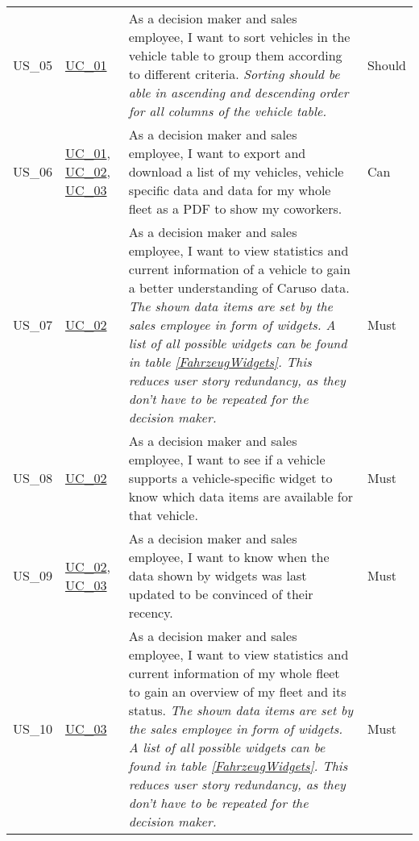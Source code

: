 \begin{footnotesize}
\begin{longtable}[L L L L]{ p{} p{} p{} p{}}
      \hypertarget{Ref:US5}{US\_05} & \hyperlink{Ref:UC1}{UC\_01} & As a decision maker and sales employee, I want to sort vehicles in the vehicle table to group them according to different criteria. 
      \newline\newline
      \emph{Sorting should be able in ascending and descending order for all columns of the vehicle table.} & Should
      \\

      \hypertarget{Ref:US6}{US\_06} & \hyperlink{Ref:UC1}{UC\_01}, \newline \hyperlink{Ref:UC2}{UC\_02}, \newline \hyperlink{Ref:UC3}{UC\_03} & As a decision maker and sales employee, I want to export and download a list of my vehicles, vehicle specific data and data for my whole fleet as a PDF to show my coworkers. & Can \\

      \hypertarget{Ref:US7}{US\_07} & \hyperlink{Ref:UC2}{UC\_02} & As a decision maker and sales employee, I want to view statistics and current information of a vehicle to gain a better understanding of Caruso data. 
      \newline\newline
      \emph{The shown data items are set by the sales employee in form of widgets. A list of all possible widgets can be found in table \ref{FahrzeugWidgets}. This reduces user story redundancy, as they don't have to be repeated for the decision maker.} & Must \\

      \hypertarget{Ref:US8}{US\_08} & \hyperlink{Ref:UC2}{UC\_02} & As a decision maker and sales employee, I want to see if a vehicle supports a vehicle-specific widget to know which data items are available for that vehicle. & Must
      \\

      \hypertarget{Ref:US9}{US\_09} & \hyperlink{Ref:UC2}{UC\_02}, \newline \hyperlink{Ref:UC3}{UC\_03} & As a decision maker and sales employee, I want to know when the data shown by widgets was last updated to be convinced of their recency. & Must
      \\

      \hypertarget{Ref:US10}{US\_10} & \hyperlink{Ref:UC3}{UC\_03} & As a decision maker and sales employee, I want to view statistics and current information of my whole fleet to gain an overview of my fleet and its status.
      \newline\newline
      \emph{The shown data items are set by the sales employee in form of widgets. A list of all possible widgets can be found in table \ref{FahrzeugWidgets}. This reduces user story redundancy, as they don't have to be repeated for the decision maker.} & Must \\


\end{longtable}
\end{footnotesize}
